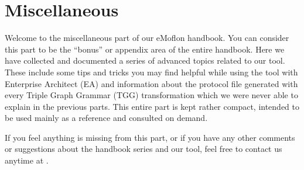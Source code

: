 \part{Miscellaneous}
\label{chap:misc}
\newpage

\genHeader

Welcome to the miscellaneous part of our eMoflon handbook.
You can consider this part to be the \enquote{bonus} or appendix area of the entire handbook. 
Here we have collected and documented a series of advanced topics related to our tool.
These include some tips and tricks you may find helpful while using the tool with Enterprise Architect (EA) and information about the protocol file generated with every Triple Graph Grammar (TGG) transformation which we were never able to explain in the previous parts.
This entire part is kept rather compact, intended to be used mainly as a reference and consulted on demand.

If you feel anything is missing from this part, or if you have any other comments or suggestions about the handbook series and our tool, feel free to contact us anytime at \eMoflonContact.

 









{}
\tableofcontents




